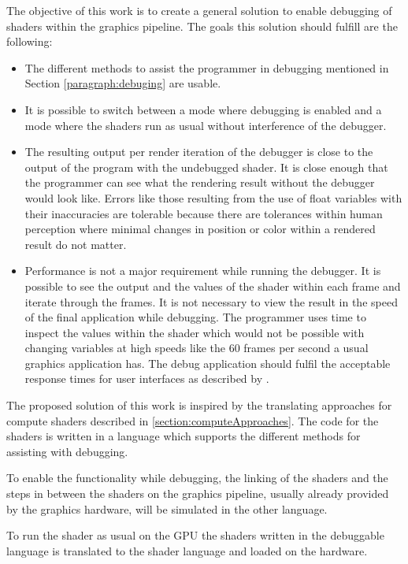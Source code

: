 The objective of this work is to create a general solution to enable debugging of shaders within the graphics pipeline. The goals this solution should fulfill are the following:

\begin{itemize}
	\item The different methods to assist the programmer in debugging mentioned in Section \ref{paragraph:debuging} are usable.
	\item It is possible to switch between a mode where debugging is enabled and a mode where the shaders run as usual without interference of the debugger.
	\item The resulting output per render iteration of the debugger is close to the output of the program with the undebugged shader. It is close enough that the programmer can see what the rendering result without the debugger would look like. Errors like those resulting from the use of float variables with their inaccuracies are tolerable because there are tolerances within human perception where minimal changes in position or color within a rendered result do not matter.
	\item Performance is not a major requirement while running the debugger. It is possible to see the output and the values of the shader within each frame and iterate through the frames. It is not necessary to view the result in the speed of the final application while debugging. The programmer uses time to inspect the values within the shader which would not be possible with changing variables at high speeds like the 60 frames per second a usual graphics application has. The debug application should fulfil the acceptable response times for user interfaces as described by .
\end{itemize}

The proposed solution of this work is inspired by the translating approaches for compute shaders described in \ref{section:computeApproaches}. The code for the shaders is written in a language which supports the different methods for assisting with debugging.

To enable the functionality while debugging, the linking of the shaders and the steps in between the shaders on the graphics pipeline, usually already provided by the graphics hardware, will be simulated in the other language.

To run the shader as usual on the GPU the shaders written in the debuggable language is translated to the shader language and loaded on the hardware.




